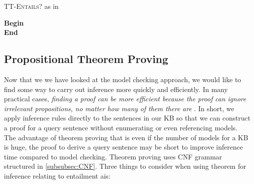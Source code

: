 \vspace{0.5cm}
\begin{algorithm}[H]
\label{algorithm:TT_entails}
\caption{\textsc{TT-Entails?} as in \citep{russell2016artificial}}
\SetAlgoLined
\DontPrintSemicolon
{}
\textbf{Begin} \\
\Indm 
\textbf{End}   \\
\end{algorithm}
\vspace{0.5cm}


\subsection{Propositional Theorem Proving}
\label{subsubsec: Inference_PL_theorem_proving}

Now that we we have looked at the model checking approach, we would like to find some way to carry out inference more quickly and efficiently. In many practical cases, \textit{finding a proof can be more efficient because the proof can ignore irrelevant propositions, no matter how many of them there are} \citep{russell2016artificial}. In short, we apply inference rules directly to the sentences in our KB so that we can construct a proof for a query sentence without enumerating or even referencing models. The advantage of theorem proving that is even if the number of models for a KB is huge, the proof to derive a query sentence may be short to improve inference time compared to model checking. Theorem proving uses CNF grammar structured in \ref{subsubsec:CNF}.
Three things to consider when using theorem for inference relating to entailment ais:

